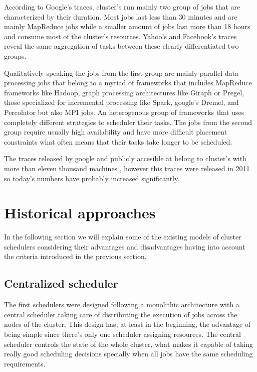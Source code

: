 \documentclass{report}                     %
\begin{document}
According to Google's traces, cluster's run mainly two group of jobs that
are characterized by their duration. Most jobs last less than 30 minutes
and are mainly MapReduce jobs while a smaller amount of jobs last
more than 18 hours and consume most of the cluster's resources. Yahoo's
and Facebook's traces reveal the same aggregation of tasks between these
clearly differentiated two groups.

Qualitatively speaking the jobs from the first group are mainly parallel
data processing jobs that belong to a myriad of frameworks that includes
MapReduce frameworks like Hadoop, graph processing architectures like
Giraph or Pregel, those specialized for incremental processing like Spark, 
google's Dremel, and Percolator but also MPI jobs. An heterogenous group
of frameworks that uses completely different strategies to scheduler their
tasks. The jobs from the second group require usually high availability and
have more difficult placement constraints what often means that their tasks
take longer to be scheduled.

The traces released by google and publicly accesible at
\cite{_googleclusterdata_????} belong to cluster's with more than
eleven thousand machines , however this traces were released in 2011
so today's numbers have probably increased significantly.


\chapter{Historical approaches}
\label{sec:approaches}


In the following section we will explain some of the existing models
of cluster schedulers considering their advantages and disadvantages
having into account the criteria introduced in the previous
section. 

\section{Centralized scheduler}

The first schedulers were designed following a monolithic architecture
with a central scheduler taking care of distributing the execution
of jobs across the nodes of the cluster. This design has, at least in
the beginning, the advantage of being simple since there's only one
scheduler assigning resources. The central scheduler controls the
state of the whole cluster, what makes it capable of taking really
good scheduling decisions specially when all jobs have the same
scheduling requirements. 
\end{document}
